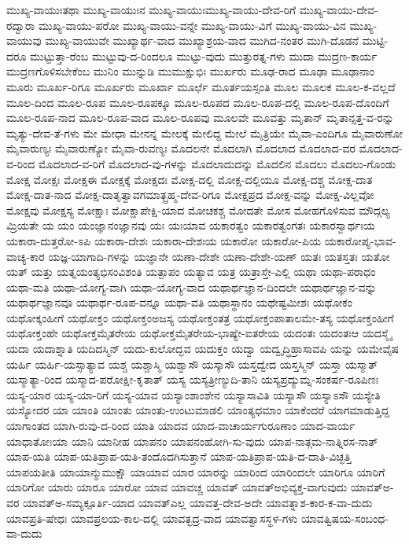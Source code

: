 {ಮುಖ್ಯ-ವಾಯುಃತಥಾ
ಮುಖ್ಯ-ವಾಯುಃನ
ಮುಖ್ಯ-ವಾಯುಃಮುಖ್ಯ-ವಾಯು-ದೇವ-ರಿಗೆ
ಮುಖ್ಯ-ವಾಯು-ದೇವ-ರದ್ವಾರಾ
ಮುಖ್ಯ-ವಾಯು-ಪರೋ
ಮುಖ್ಯ-ವಾಯು-ವನ್ನೇ
ಮುಖ್ಯ-ವಾಯು-ವಿಗೆ
ಮುಖ್ಯ-ವಾಯು-ವಿನ
ಮುಖ್ಯ-ವಾಯುವು
ಮುಖ್ಯ-ವಾಯುವೇ
ಮುಖ್ಯಾರ್ಥ-ವಾದ
ಮುಖ್ಯಾಶ್ರಯ-ವಾದ
ಮುಗಿದ-ನಂತರ
ಮುಗಿ-ದೊಡನೆ
ಮುಟ್ಟಿ-ದರೂ
ಮುಟ್ಟುತ್ತಾ-ರೆಂಬ
ಮುಟ್ಟುವು-ದ-ರಿಂದಲೂ
ಮುಟ್ಟು-ವುದು
ಮುತ್ತುರತ್ನ-ಗಳು
ಮುದಾ
ಮುದ್ರಣ-ಕಾರ್ಯ
ಮುದ್ರಣಗೊಳಿಸಬೇಕೆಂಬ
ಮುನಿಂ
ಮುನ್ನುಡಿ
ಮುಮುಕ್ಷುಭಿಃ
ಮುರ್ಖರು
ಮೂಢ-ರಾದ
ಮೂಢಾ
ಮೂಢಾನಾಂ
ಮೂರು
ಮೂರ್ಖ-ರಿಗೂ
ಮೂರ್ಖರು
ಮೂರ್ಖಾ
ಮೂರ್ಛೆ
ಮೂರ್ತಯಸ್ಸಂತಿ
ಮೂಲ
ಮೂಲಕ
ಮೂಲ-ಕ-ವಲ್ಲದೆ
ಮೂಲ-ದಿಂದ
ಮೂಲ-ರೂಪ
ಮೂಲ-ರೂಪಕ್ಕೂ
ಮೂಲ-ರೂಪದ
ಮೂಲ-ರೂಪ-ದಲ್ಲಿ
ಮೂಲ-ರೂಪ-ದೊಂದಿಗೆ
ಮೂಲ-ರೂಪ-ನಾದ
ಮೂಲ-ರೂಪ-ವಾದ
ಮೂಲ-ರೂಪವು
ಮೂಲವೇ
ಮೂವತ್ತು
ಮೃತಾನ್
ಮೃತಾನ್ಸತ್ತ-ವ-ರನ್ನು
ಮೃತ್ಯು-ದೇವ-ತೆ-ಗಳು
ಮೇ
ಮೇಧಾ
ಮೇನನ್ನ
ಮೇಲಕ್ಕೆ
ಮೇಲಿದ್ದ
ಮೇಲೆ
ಮೈತ್ರಿಯೇ
ಮೈವಾ-ಎಂದಿಗೂ
ಮೈವಾರುಣೋ
ಮೈವಾರುಣ್ಯಃ
ಮೈವಾರುಣ್ಯೋ
ಮೈವಾ-ರುವಣ್ಯಃ
ಮೊದಲನೇ
ಮೊದಲಾಗಿ
ಮೊದಲಾದ
ಮೊದಲಾದ-ವರ
ಮೊದಲಾದ-ವ-ರಿಂದ
ಮೊದಲಾದ-ವ-ರಿಗೆ
ಮೊದಲಾದ-ವು-ಗಳನ್ನು
ಮೊದಲಾದುದನ್ನು
ಮೊದಲಿನ
ಮೊದಲು
ಮೊದಲು-ಗೊಂಡು
ಮೋಕ್ಷ
ಮೋಕ್ಷಃ
ಮೋಕ್ಷಈ
ಮೋಕ್ಷಕ್ಕೆ
ಮೋಕ್ಷದಃ
ಮೋಕ್ಷ-ದಲ್ಲಿ
ಮೋಕ್ಷ-ದಲ್ಲಿಯೂ
ಮೋಕ್ಷ-ದಶ್ಚ
ಮೋಕ್ಷ-ದಾತ
ಮೋಕ್ಷ-ದಾತ-ನಾದ
ಮೋಕ್ಷ-ದಾತೃತ್ವಾವಗಮಾತ್ಬ್ರಹ್ಮ-ದೇವ-ರಿಗೂ
ಮೋಕ್ಷಪ್ರದ
ಮೋಕ್ಷ-ವನ್ನು
ಮೋಕ್ಷ-ವಿಲ್ಲವೋ
ಮೋಕ್ಷವು
ಮೋಕ್ಷಸ್ಯ
ಮೋಕ್ಷಾಃ
ಮೋಕ್ಷಾಪೇಕ್ಷಿ-ಯಾದ
ಮೋಚಕಶ್ಚ
ಮೋದತೇ
ಮೋಸ
ಮೋಹಗೊಳಿಸುವ
ಮೌದ್ಗಲ್ಯ
ಮ್ರಿಯತೇ
ಯ
ಯಂ
ಯಂಜ್ಞಾನಂಜ್ಞಾನವು
ಯಃ
ಯಃಯಾವ
ಯಕಾರತ್ವಂ
ಯಕಾರತ್ವಂಗತಃ
ಯಕಾರಸ್ವಾರ್ಥಃಯ
ಯಕಾರಾ-ದುತ್ತರೋ-ಽಪಿ
ಯಕಾರಾ-ದೇಶಃ
ಯಕಾರಾ-ದೇಶಃಯ
ಯಕಾರೋ
ಯಕಾರೋ-ಪಿಯ
ಯಕಾರೋಪ್ಯ-ಭಾವ-ವಾಚ್ಯ-ಕಾರ
ಯಜ್ಞ-ಯಾಗಾದಿ-ಗಳನ್ನು
ಯಜ್ಞಾನೇ
ಯಣಾ-ದೇಶೇ
ಯಣಾ-ದೇಶೇ-ಯಣ್
ಯತಃ
ಯತಸ್ತತಃ
ಯತೋ
ಯತ್
ಯತ್ತು
ಯತ್ನಯಂತ್ಯಭಿಸಂವಿಶಂತಿ
ಯತ್ಪಾಪಂ
ಯತ್ಯಾವ
ಯತ್ರ
ಯತ್ರಾಸ್ತೇ-ಎಲ್ಲಿ
ಯಥಾ
ಯಥಾ-ಪರಾಧಂ
ಯಥಾ-ಮತಿ
ಯಥಾ-ಯೋಗ್ಯ-ವಾಗಿ
ಯಥಾ-ಯೋಗ್ಯ-ವಾದ
ಯಥಾರ್ಥಜ್ಞಾನ-ದಿಂದಲೇ
ಯಥಾರ್ಥಜ್ಞಾನ-ವನ್ನು
ಯಥಾರ್ಥಜ್ಞಾನವೂ
ಯಥಾರ್ಥ-ರೂಪ-ವನ್ನೂ
ಯಥಾ-ವತಿ
ಯಥಾಸ್ಥಾನಂ
ಯಥೇಷ್ಟಮೀಶಃ
ಯಥೋಕಂ
ಯಥೋಕ್ಕಂಹೀಗೆ
ಯಥೋಕ್ತಂ
ಯಥೋಕ್ತಂಅಜಸ್ಯ
ಯಥೋಕ್ತಂತತ್ರ
ಯಥೋಕ್ತಂಪಾತಾಲಮೇ-ತಸ್ಯ
ಯಥೋಕ್ತಂಹೀಗೆ
ಯಥೋಕ್ತಂಹೇ
ಯಥೋಕ್ತಮೈತರೇಯ
ಯಥೋಕ್ತಮೈತರೇಯ-ಭಾಷ್ಯೇ-ಐತರೇಯ
ಯದಂತಃ
ಯದಂತಃಆ
ಯದಸ್ಮೈ
ಯದಾ
ಯದಾಶ್ನಾತಿ
ಯದಿದಸ್ಮಿನ್
ಯದು-ಕುಲೋದ್ಭವ
ಯದುಕ್ತಂ
ಯದ್ವಾ
ಯದ್ವೃದ್ಧಿಹ್ರಾಸಾವಪಿ
ಯನ್ನು
ಯಮೇವೈಷ
ಯರ್ಹಿ
ಯರ್ಹಿ-ಯಸ್ಸಾತ್ಯಾವ
ಯಶ್ಚ
ಯಶ್ಚಾಸ್ಮಿ
ಯಶ್ವಾಸೌ
ಯಸ್ಕಾಸೌ
ಯಸ್ತದ್ವೇದ
ಯಸ್ತಸ್ಮಿನ್
ಯಸ್ತಾ
ಯಸ್ಮಾತ್
ಯಸ್ಮಾತ್ಯಾ-ರಿಂದ
ಯಸ್ಮಾದ-ಪರೋಕ್ಷೀ-ಕೃತಾತ್
ಯಸ್ಯ
ಯಸ್ಯತ್ರೀಣ್ಯುದಿ-ತಾನಿ
ಯಸ್ಯಪ್ರದ್ಯುಮ್ನ-ಸಂಕರ್ಷ-ರೂಪಿಣಃ
ಯಸ್ಯ-ಯಾರ
ಯಸ್ಯ-ಯಾ-ರಿಗೆ
ಯಸ್ಯ-ಯಾವ
ಯಸ್ಯಾಂಶಾಂಶೇನ
ಯಸ್ಯಾಸಾವಿತಿ
ಯಸ್ಯಾಸೌ
ಯಸ್ಯಾಽಸೌ
ಯಸ್ಯೇತಿ
ಯಸ್ಯೋದರ
ಯಾ
ಯಾಂತಿ
ಯಾಂತು
ಯಾಂತು-ಉಂಟುಮಾಡಲಿ
ಯಾಂತ್ಯಧಮಾಂ
ಯಾಕೆಂದರೆ
ಯಾಗಮಾಡುತ್ತಿದ್ದ
ಯಾಗಾಂತದ
ಯಾಗಿ-ರುವು-ದ-ರಿಂದ
ಯಾತಿ
ಯಾದವ
ಯಾದ-ವಾಚಾರ್ಯಗುರೂಣಾಂ
ಯಾದ-ವಾರ್ಯ
ಯಾಧಾತೋಃಯಾ
ಯಾನಿ
ಯಾನೀಹ
ಯಾಪನಂ
ಯಾಪನಂಹೋಗಿ-ಸು-ವುದು
ಯಾಪ-ನಾತ್ಗಮ-ನಾತ್ನಿರಸ-ನಾತ್
ಯಾಪ-ಯತಿ
ಯಾಪ-ಯತಿಪ್ರಾಪ-ಯತಿ-ತಂದೊದಗಿಸುತ್ತಾನೆ
ಯಾಪ-ಯತಿಪ್ರಾಪ-ಯತಿ-ದ-ದಾತಿ-ವಿಚ್ಛತ್ತಿ
ಯಾಪಯತೀತಿ
ಯಾಯಾನ್ಮುಮುಕ್ಷೌ
ಯಾಯಾವ
ಯಾರ
ಯಾರನ್ನು
ಯಾರಿಂದ
ಯಾರಿಂದಲೇ
ಯಾರಿಗೂ
ಯಾರಿಗೆ
ಯಾರಿಗೋ
ಯಾರು
ಯಾರೂ
ಯಾರೋ
ಯಾವ
ಯಾವಚ್ಚ
ಯಾವತ್
ಯಾವತ್ಅಭಿವ್ಯಕ್ತ-ವಾಗುವುದು
ಯಾವತ್ಅ-ವರ
ಯಾವತ್ಅ-ಸಮ್ಯಕ್ಪೂರ್ತಿ-ಯಾದ
ಯಾವತ್ಎಲ್ಲ
ಯಾವತ್ತ-ದೇವ-ಅದೇ
ಯಾವತ್ನಾಶ-ಕಾರ-ಕ-ವಾ-ದುದು
ಯಾವಪ್ರತಿ-ಷೇಧಃ
ಯಾವಪ್ರಲಯ-ಕಾಲ-ದಲ್ಲಿ
ಯಾವತ್ಭದ್ರ-ವಾದ
ಯಾವತ್ವಾಸಸ್ಥಳ-ಗಳು
ಯಾವತ್ವಿಷಯ-ಸಂಬಂಧ-ವಾ-ದುದು
}
